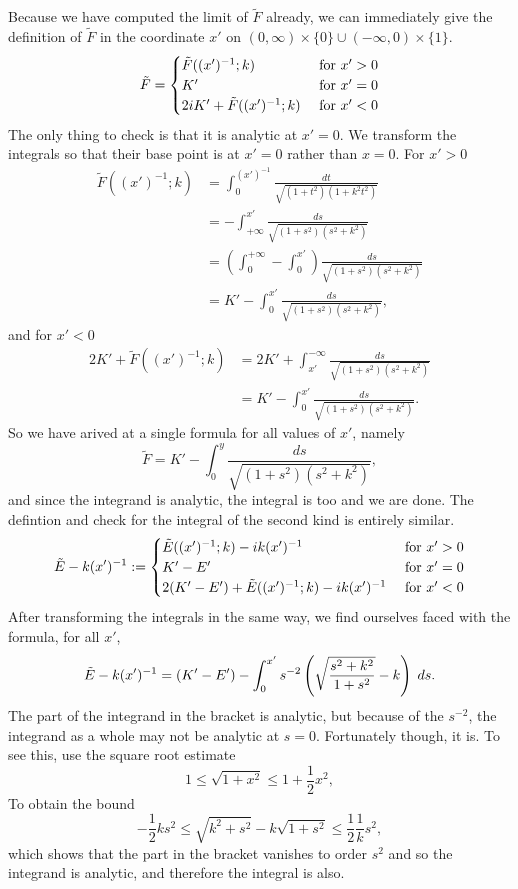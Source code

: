 Because we have computed the limit of $\tilde{F}$ already, we can immediately give the definition of $\tilde{F}$ in the coordinate $x'$ on $(0,\infty)\times\{0\} \cup (-\infty,0)\times \{1\}$.
\[
\tilde{F} =
\begin{cases}
\tilde F((x')^{-1}; k)             & \text{ for } x' > 0 \\
K'                              & \text{ for } x' = 0 \\
2i K' + \tilde F((x')^{-1}; k)   & \text{ for } x' < 0
\end{cases}
\]
The only thing to check is that it is analytic at $x'=0$. We transform the integrals so that their base point is at $x'=0$ rather than $x=0$. For $x'>0$
\begin{align*}
\tilde F( (x')^{-1}; k)
&= \int_0^{(x')^{-1}} \frac{dt}{\sqrt{(1+t^2)(1+k^2t^2)}} \\
&= - \int_{+\infty}^{x'} \frac{ds}{\sqrt{(1+s^2)(s^2+k^2)}} \\
&= \left(\int_0^{+\infty} - \int_0^{x'} \right) \frac{ds}{\sqrt{(1+s^2)(s^2+k^2)}} \\
&= K' - \int_0^{x'} \frac{ds}{\sqrt{(1+s^2)(s^2+k^2)}},
\end{align*}
and for $x' < 0$
\begin{align*}
2 K' + \tilde F((x')^{-1}; k)
&= 2 K' + \int_{x'}^{-\infty} \frac{ds}{\sqrt{(1+s^2)(s^2+k^2)}} \\
&=  K' - \int_0^{x'} \frac{ds}{\sqrt{(1+s^2)(s^2+k^2)}}.
\end{align*}
So we have arived at a single formula for all values of $x'$, namely
\[
\tilde{F} = K' - \int_0^y \frac{ds}{\sqrt{(1+s^2)(s^2+k^2)}},
\]
and since the integrand is analytic, the integral is too and we are done. The defintion and check for the integral of the second kind is entirely similar.
\[
\tilde{E} - k(x')^{-1} :=
\begin{cases}
\tilde E((x')^{-1}; k) - i k(x')^{-1}                 & \text{ for } x' > 0 \\
K'-E'                                                   & \text{ for } x' = 0 \\
2(K'-E') + \tilde E((x')^{-1}; k)  - i k(x')^{-1}     & \text{ for } x' < 0
\end{cases}
\]
After transforming the integrals in the same way, we find ourselves faced with the formula, for all $x'$,
\[
\tilde{E} - k(x')^{-1} = (K'-E') - \int_0^{x'} s^{-2}\left( \sqrt{\frac{s^2 + k^2}{1 + s^2}} - k \right)\;ds.
\]
The part of the integrand in the bracket is analytic, but because of the $s^{-2}$, the integrand as a whole may not be analytic at $s=0$. Fortunately though, it is. To see this, use the square root estimate
\[
1 \leq \sqrt {1 + x^2} \leq 1 + \frac{1}{2}x^2,
\]
To obtain the bound
\[
-\frac{1}{2}k s^2 \leq \sqrt{k^2 + s^2} - k \sqrt{1+s^2} \leq \frac{1}{2}\frac{1}{k} s^2,
\]
which shows that the part in the bracket vanishes to order $s^2$ and so the integrand is analytic, and therefore the integral is also.
